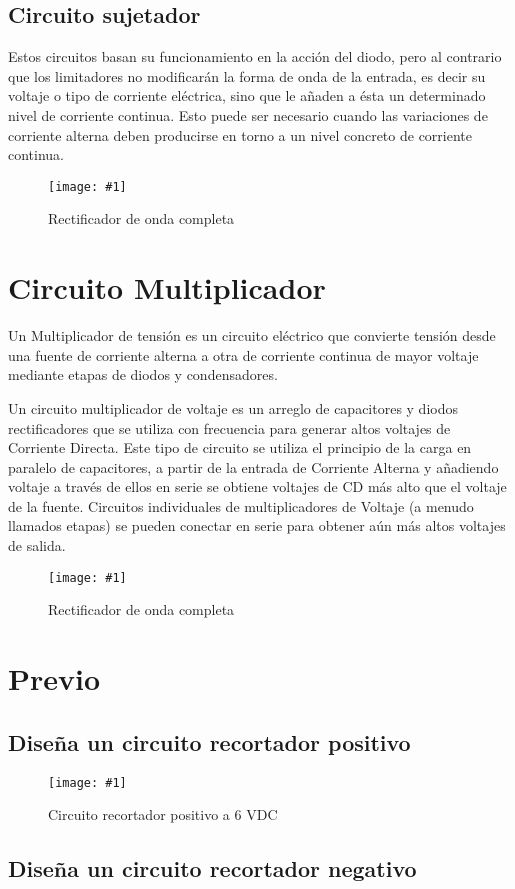 \documentclass{mylib/reporteConCalif}
\newcommand{\insertImage}[3]{
	\begin{figure}[H]
		\centering
		\texttt{[image: \#1]}
		\caption{#2}
	\end{figure}
}
\begin{document}
\subsection{Circuito sujetador}

Estos circuitos basan su funcionamiento en la acción del diodo, pero al contrario que los limitadores no modificarán la forma de onda de la entrada, es decir su voltaje o tipo de corriente eléctrica, sino que le añaden a ésta un determinado nivel de corriente continua. Esto puede ser necesario cuando las variaciones de corriente alterna deben producirse en torno a un nivel concreto de corriente continua.

\insertImage{img/labdisp_pract5/suj}{Rectificador de onda completa}{8}

\section{Circuito Multiplicador}

Un Multiplicador de tensión es un circuito eléctrico que convierte tensión desde una fuente de corriente alterna a otra de corriente continua de mayor voltaje mediante etapas de diodos y condensadores.


Un circuito multiplicador de voltaje es un arreglo de capacitores y diodos rectificadores que se utiliza con frecuencia para generar altos voltajes de Corriente Directa. Este tipo de circuito se utiliza el principio de la carga en paralelo de capacitores, a partir de la entrada de Corriente Alterna y añadiendo voltaje a través de ellos en serie se obtiene voltajes de CD más alto que el voltaje de la fuente. Circuitos individuales de multiplicadores de Voltaje (a menudo llamados etapas) se pueden conectar en serie para obtener aún más altos voltajes de salida.

\insertImage{img/labdisp_pract5/mult}{Rectificador de onda completa}{8}


\newpage
\section{Previo}

\subsection{Diseña un circuito recortador positivo}

\insertImage{img/labdisp_pract5/recPolPos}{Circuito recortador positivo a 6 VDC}{12}

\subsection{Diseña un circuito recortador negativo}
\end{document}
